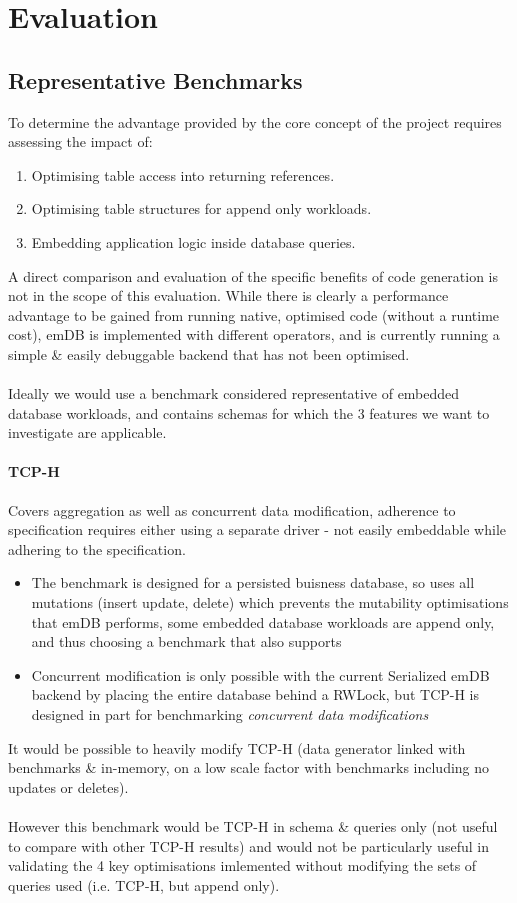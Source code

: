 \chapter{Evaluation}

\section{Representative Benchmarks}
To determine the advantage provided by the core concept of the project requires assessing the impact of:
\begin{enumerate}
    \setlength\itemsep{0em}
    \item Optimising table access into returning references.
    \item Optimising table structures for append only workloads.
    \item Embedding application logic inside database queries.
\end{enumerate}
A direct comparison and evaluation of the specific benefits of code generation is not in the scope of this evaluation.
While there is clearly a performance advantage to be gained from running native, optimised code (without a runtime cost), emDB
is implemented with different operators, and is currently running a simple \& easily debuggable backend that has not been optimised.
\\
\\ Ideally we would use a benchmark considered representative of embedded database workloads,
and contains schemas for which the 3 features we want to investigate are applicable.
\subsubsection{TCP-H}
Covers aggregation as well as concurrent data modification, adherence to specification
requires either using a separate driver - not easily embeddable while adhering to the specification.
\begin{itemize}
    \setlength\itemsep{0em}
    \item The benchmark is designed for a persisted buisness database, so uses all mutations (insert update, delete)
          which prevents the mutability optimisations that emDB performs,
          some embedded database workloads are append only, and thus choosing a benchmark that also
          supports
    \item Concurrent modification is only possible with the current Serialized emDB backend by placing
          the entire database behind a RWLock, but TCP-H is designed in part for benchmarking \textit{concurrent data modifications}\cite{TCPHSpec}
\end{itemize}
It would be possible to heavily modify TCP-H (data generator linked with benchmarks \& in-memory, on a
low scale factor with benchmarks including no updates or deletes).
\\
\\ However this benchmark would be TCP-H in schema \& queries only (not useful to compare with other TCP-H results)
and would not be particularly useful in validating the 4 key optimisations imlemented without modifying
the sets of queries used (i.e. TCP-H, but append only).

